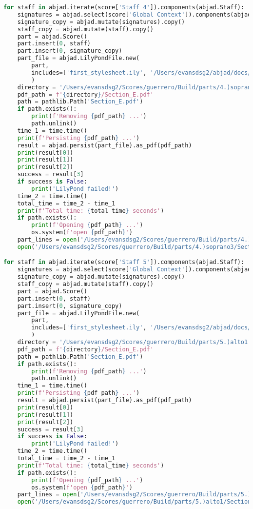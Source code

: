 \begin{lstlisting}[language=Python, caption=Invocation Source Code]
for staff in abjad.iterate(score['Staff 4']).components(abjad.Staff):
    signatures = abjad.select(score['Global Context']).components(abjad.Staff)
    signature_copy = abjad.mutate(signatures).copy()
    staff_copy = abjad.mutate(staff).copy()
    part = abjad.Score()
    part.insert(0, staff)
    part.insert(0, signature_copy)
    part_file = abjad.LilyPondFile.new(
        part,
        includes=['first_stylesheet.ily', '/Users/evansdsg2/abjad/docs/source/_stylesheets/abjad.ily'],
        )
    directory = '/Users/evansdsg2/Scores/guerrero/Build/parts/4.)soprano3'
    pdf_path = f'{directory}/Section_E.pdf'
    path = pathlib.Path('Section_E.pdf')
    if path.exists():
        print(f'Removing {pdf_path} ...')
        path.unlink()
    time_1 = time.time()
    print(f'Persisting {pdf_path} ...')
    result = abjad.persist(part_file).as_pdf(pdf_path)
    print(result[0])
    print(result[1])
    print(result[2])
    success = result[3]
    if success is False:
        print('LilyPond failed!')
    time_2 = time.time()
    total_time = time_2 - time_1
    print(f'Total time: {total_time} seconds')
    if path.exists():
        print(f'Opening {pdf_path} ...')
        os.system(f'open {pdf_path}')
    part_lines = open('/Users/evansdsg2/Scores/guerrero/Build/parts/4.)soprano3/Section_E.ly').readlines()
    open('/Users/evansdsg2/Scores/guerrero/Build/parts/4.)soprano3/Section_E.ly', 'w').writelines(part_lines[15:-1])

for staff in abjad.iterate(score['Staff 5']).components(abjad.Staff):
    signatures = abjad.select(score['Global Context']).components(abjad.Staff)
    signature_copy = abjad.mutate(signatures).copy()
    staff_copy = abjad.mutate(staff).copy()
    part = abjad.Score()
    part.insert(0, staff)
    part.insert(0, signature_copy)
    part_file = abjad.LilyPondFile.new(
        part,
        includes=['first_stylesheet.ily', '/Users/evansdsg2/abjad/docs/source/_stylesheets/abjad.ily'],
        )
    directory = '/Users/evansdsg2/Scores/guerrero/Build/parts/5.)alto1'
    pdf_path = f'{directory}/Section_E.pdf'
    path = pathlib.Path('Section_E.pdf')
    if path.exists():
        print(f'Removing {pdf_path} ...')
        path.unlink()
    time_1 = time.time()
    print(f'Persisting {pdf_path} ...')
    result = abjad.persist(part_file).as_pdf(pdf_path)
    print(result[0])
    print(result[1])
    print(result[2])
    success = result[3]
    if success is False:
        print('LilyPond failed!')
    time_2 = time.time()
    total_time = time_2 - time_1
    print(f'Total time: {total_time} seconds')
    if path.exists():
        print(f'Opening {pdf_path} ...')
        os.system(f'open {pdf_path}')
    part_lines = open('/Users/evansdsg2/Scores/guerrero/Build/parts/5.)alto1/Section_E.ly').readlines()
    open('/Users/evansdsg2/Scores/guerrero/Build/parts/5.)alto1/Section_E.ly', 'w').writelines(part_lines[15:-1])


\end{lstlisting}
